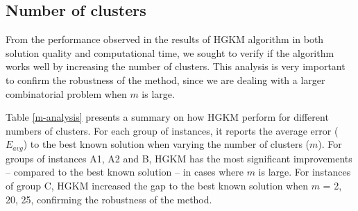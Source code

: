 





\subsection{Number of clusters}

From the performance observed in the results of HGKM algorithm in both solution quality and computational time, we sought to verify if the algorithm works well by increasing the number of clusters. %
This analysis is very important to confirm the robustness of the method, since we are dealing with a larger combinatorial problem when $m$ is large.

Table \ref{m-analysis} presents a summary on how HGKM perform for different numbers of clusters.
For each group of instances, it reports the average error ($E_{avg}$) to the best known solution when varying the number of clusters ($m$). For groups of instances A1, A2 and B, HGKM has the most significant improvements -- compared to the best known solution -- in cases where $m$ is large. For instances of group C, HGKM increased the gap to the best known solution when $m$ = 2, 20, 25, confirming the robustness of the method.





